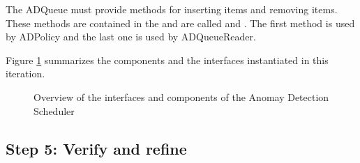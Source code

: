 \npar The ADQueue must provide methods for inserting items and removing items.
These methods are contained in the  and are called
 and . The first method is used by ADPolicy and the last one is used by
ADQueueReader.

\npar Figure \ref{fig:it5/interfaces} summarizes the components and the
interfaces instantiated in this iteration.

\begin{figure}[H]
	\begin{centering}
		\caption{Overview of the interfaces and components of the Anomay Detection
		Scheduler}
		\label{fig:it5/interfaces}
	\end{centering}
\end{figure}

\subsection{Step 5: Verify and refine}
\label{add:it5/verification}

